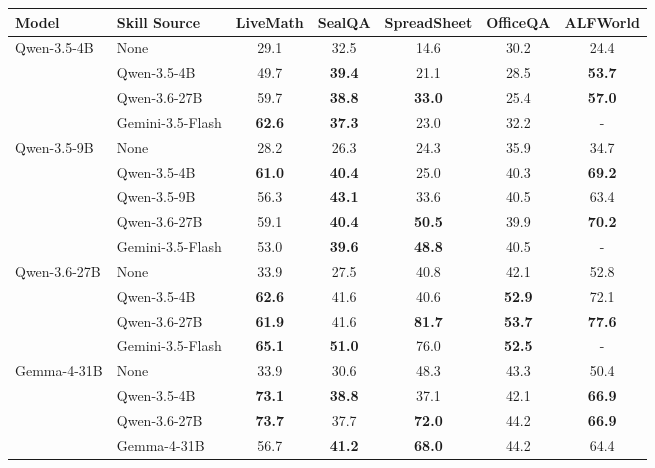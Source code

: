 \documentclass[11pt, a4paper, copyright, gr]{google}
\newcommand{\methodcolor}[1]{\cellcolor[HTML]{FDE293}#1}
\begin{document}
\begin{table}[t]
\centering
\small
\renewcommand{\tabcolsep}{1.8mm}
\begin{tabular}{llccccc}
\toprule
\textbf{Model} & \textbf{Skill Source} & \textbf{LiveMath} & \textbf{SealQA} & \textbf{SpreadSheet} & \textbf{OfficeQA} & \textbf{ALFWorld} \\
\midrule
\multirow{4}{*}{Qwen-3.5-4B} & None & 29.1 & 32.5 & 14.6 & 30.2 & 24.4 \\
 & \methodcolor{Qwen-3.5-4B} & \methodcolor{49.7} & \methodcolor{\textbf{39.4}} & \methodcolor{21.1} & \methodcolor{28.5} & \methodcolor{\textbf{53.7}} \\
 & Qwen-3.6-27B & 59.7 & \textbf{38.8} & \textbf{33.0} & 25.4 & \textbf{57.0}\\
 & Gemini-3.5-Flash & \textbf{62.6} & \textbf{37.3} & 23.0 & 32.2 & - \\
\midrule
\multirow{5}{*}{Qwen-3.5-9B} & None & 28.2 & 26.3 & 24.3 & 35.9 & 34.7 \\
 & Qwen-3.5-4B & \textbf{61.0} & \textbf{40.4} & 25.0 & 40.3 & \textbf{69.2} \\
 & \methodcolor{Qwen-3.5-9B} & \methodcolor{56.3} & \methodcolor{\textbf{43.1}} & \methodcolor{33.6} & \methodcolor{40.5} & \methodcolor{63.4} \\
 & Qwen-3.6-27B & 59.1 & \textbf{40.4} & \textbf{50.5} & 39.9 & \textbf{70.2} \\
 & Gemini-3.5-Flash & 53.0 & {\textbf{39.6}} & \textbf{48.8} & 40.5 & - \\
\midrule
\multirow{4}{*}{Qwen-3.6-27B} & None & 33.9 & 27.5 & 40.8 & 42.1 & 52.8 \\
 & Qwen-3.5-4B & \textbf{62.6} & 41.6 & 40.6 & \textbf{52.9} & 72.1 \\
 & \methodcolor{Qwen-3.6-27B} & \methodcolor{\textbf{61.9}} & \methodcolor{41.6} & \methodcolor{\textbf{81.7}} & \methodcolor{\textbf{53.7}} & \methodcolor{\textbf{77.6}} \\
 & Gemini-3.5-Flash & \textbf{65.1} & \textbf{51.0} & 76.0 & \textbf{52.5} & - \\
\midrule
\multirow{5}{*}{Gemma-4-31B} & None & 33.9 & 30.6 & 48.3 & 43.3 & 50.4 \\
 & Qwen-3.5-4B & \textbf{73.1} & \textbf{38.8} & 37.1 & 42.1 & \textbf{66.9}\\
 & Qwen-3.6-27B & \textbf{73.7} & 37.7 & \textbf{72.0} & 44.2 & \textbf{66.9} \\
 & \methodcolor{Gemma-4-31B} & \methodcolor{56.7} & \methodcolor{\textbf{41.2}} & \methodcolor{\textbf{68.0}} & \methodcolor{44.2} & \methodcolor{64.4} \\

\end{tabular}
\end{table}
\end{document}

